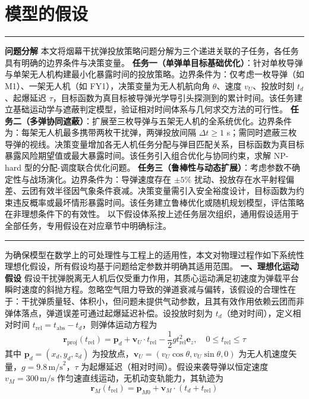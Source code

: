 \documentclass{JXUSTmodeling}
\begin{document}
\section{模型的假设}
\noindent\rule{\textwidth}{0.4pt}
\textbf{问题分解}
本文将烟幕干扰弹投放策略问题分解为三个递进关联的子任务，各任务具有明确的边界条件与决策变量。
\textbf{任务一（单弹单目标基础优化）}：针对单枚导弹与单架无人机构建最小化暴露时间的投放策略。边界条件为：仅考虑一枚导弹（如 M1）、一架无人机（如 FY1），决策变量为无人机航向角 $\theta$、速度 $v_U$、投放时刻 $t_d$、起爆延迟 $\tau$，目标函数为真目标被导弹光学导引头探测到的累计时间。该任务建立基础运动学与遮蔽判定模型，验证相对时间体系与几何求交方法的可行性。
\textbf{任务二（多弹协同遮蔽）}：扩展至三枚导弹与五架无人机的全系统优化。边界条件为：每架无人机最多携带两枚干扰弹，两弹投放间隔 $\Delta t \geq 1$ s；需同时遮蔽三枚导弹的视线。决策变量增加各无人机任务分配与弹目匹配关系，目标函数为真目标暴露风险期望值或最大暴露时间。该任务引入组合优化与协同约束，求解 NP-hard 型的分配-调度联合优化问题。
\textbf{任务三（鲁棒性与动态扩展）}：考虑参数不确定性与战场演化。边界条件为：导弹速度存在 $\pm 5\%$ 扰动、投放存在水平射程偏差、云团有效半径因气象条件衰减。决策变量需引入安全裕度设计，目标函数为约束违反概率或最坏情形暴露时间。该任务建立鲁棒优化或随机规划模型，评估策略在非理想条件下的有效性。
以下假设体系按上述任务层次组织，通用假设适用于全部任务，专用假设在对应章节中明确标注。
\noindent\rule{\textwidth}{0.4pt}
为确保模型在数学上的可处理性与工程上的适用性，本文对物理过程作如下系统性理想化假设，所有假设均基于问题给定参数并明确其适用范围。
\textbf{一、理想化运动假设}
假设干扰弹脱离无人机后仅受重力作用，其质心运动满足初速度为弹载平台瞬时速度的斜抛方程。忽略空气阻力导致的弹道衰减与偏转，该假设的合理性在于：干扰弹质量轻、体积小，但问题未提供气动参数，且其有效作用依赖云团而非弹体落点，弹道误差可通过起爆延迟补偿。设投放时刻为 $t_d$（绝对时间），定义相对时间 $t_{\text{rel}} = t_{\text{abs}} - t_d$，则弹体运动方程为
\begin{equation}
\mathbf{r}_{\text{proj}}(t_{\text{rel}}) = \mathbf{p}_d + \mathbf{v}_U \cdot t_{\text{rel}} - \frac{1}{2}g t_{\text{rel}}^2 \mathbf{e}_z, \quad 0 \leq t_{\text{rel}} \leq \tau \tag{1}
\end{equation}
其中 $\mathbf{p}_d=(x_d,y_d,z_d)$ 为投放点，$\mathbf{v}_U=(v_U\cos\theta, v_U\sin\theta, 0)$ 为无人机速度矢量，$g=9.8\,\text{m/s}^2$，$\tau$ 为起爆延迟（相对时间）。假设来袭导弹以恒定速度 $v_M=300\,\text{m/s}$ 作匀速直线运动，无机动变轨能力，其轨迹为
\begin{equation}
\mathbf{r}_M(t_{\text{rel}}) = \mathbf{p}_{M0} + \mathbf{v}_M \cdot (t_d + t_{\text{rel}}) \tag{2}
\end{equation}
\end{document}
